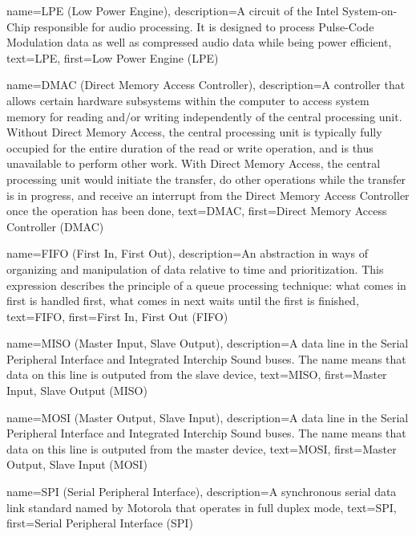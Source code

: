 
{
  name=LPE (Low Power Engine),
  description={A circuit of the Intel System-on-Chip responsible for
    audio processing. It is designed to process Pulse-Code Modulation
    data as well as compressed audio data while being power efficient},
  text=LPE,
  first=Low Power Engine (LPE)
}

{
  name=DMAC (Direct Memory Access Controller),
  description={A controller that allows certain hardware subsystems
    within the computer to access system memory for reading and/or
    writing independently of the central processing unit. Without
    Direct Memory Access, the central processing unit is typically
    fully occupied for the entire duration of the read or write
    operation, and is thus unavailable to perform other work. With
    Direct Memory Access, the central processing unit would initiate
    the transfer, do other operations while the transfer is in
    progress, and receive an interrupt from the Direct Memory Access
    Controller once the operation has been done},
  text=DMAC,
  first=Direct Memory Access Controller (DMAC)
}

{
  name={FIFO (First In, First Out)},
  description={An abstraction in ways of organizing and manipulation
    of data relative to time and prioritization. This expression
    describes the principle of a queue processing technique: what
    comes in first is handled first, what comes in next waits until
    the first is finished},
  text=FIFO,
  first={First In, First Out (FIFO)}
}

{
  name={MISO (Master Input, Slave Output)},
  description={A data line in the Serial Peripheral Interface and
    Integrated Interchip Sound buses. The name means that data on this
    line is outputed from the slave device},
  text=MISO,
  first={Master Input, Slave Output (MISO)}
}

{
  name={MOSI (Master Output, Slave Input)},
  description={A data line in the Serial Peripheral Interface and
    Integrated Interchip Sound buses. The name means that data on this
    line is outputed from the master device},
  text=MOSI,
  first={Master Output, Slave Input (MOSI)}
}

{
  name=SPI (Serial Peripheral Interface),
  description={A synchronous serial data link standard named by
    Motorola that operates in full duplex mode},
  text=SPI,
  first=Serial Peripheral Interface (SPI)
}

